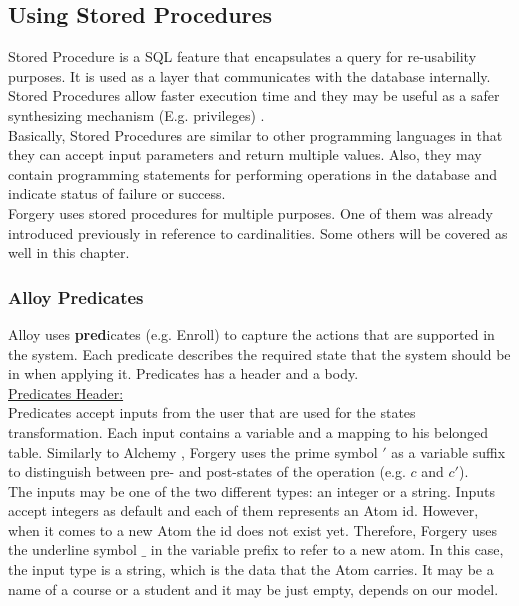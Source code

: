 \documentclass[oneside]{book}
\begin{document}
\newpage
\subsection{Using Stored Procedures}

\noindent Stored Procedure is a SQL feature that encapsulates a query for re-usability purposes. It is used as a layer that communicates with the database internally. Stored Procedures allow faster execution time and they may be useful as a safer synthesizing mechanism (E.g. privileges) \cite{when}.\\

\noindent Basically, Stored Procedures are similar to other programming languages in that they can accept input parameters and return multiple values. Also, they may contain programming statements for performing operations in the database and indicate status of failure or success.\\

\noindent Forgery uses stored procedures for multiple purposes. One of them was already introduced previously in reference to cardinalities. Some others will be covered as well in this chapter.\\

\subsubsection{Alloy Predicates}

\noindent Alloy uses \textbf{pred}icates (e.g. Enroll) to capture the actions that are supported in the system. Each predicate describes the required state that the system should be in when applying it. Predicates has a header and a body. \\

\noindent\underline{Predicates Header:}\\

\noindent Predicates accept inputs from the user that are used for the states transformation. Each input contains a variable and a mapping to his belonged table. Similarly to Alchemy \cite{alchemy}, Forgery uses the prime symbol $'$ as a variable suffix to distinguish between pre- and post-states of the operation (e.g. $c$ and $c'$).\\

\noindent The inputs may be one of the two different types: an integer or a string. Inputs accept integers as default and each of them represents an Atom id. However, when it comes to a new Atom the id does not exist yet. Therefore, Forgery uses the underline symbol $\_$ in the variable prefix to refer to a new atom. In this case, the input type is a string, which is the data that the Atom carries. It may be a name of a course or a student and it may be just empty, depends on our model.\\
\end{document}
